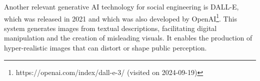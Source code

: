 Another relevant generative AI technology for social engineering is DALL-E, which was released in 2021 and which was also developed by OpenAI\footnote{https://openai.com/index/dall-e-3/ (visited on 2024-09-19)}. This system generates images from textual descriptions, facilitating digital manipulation and the creation of misleading visuals. It enables the production of hyper-realistic images that can distort or shape public perception.
